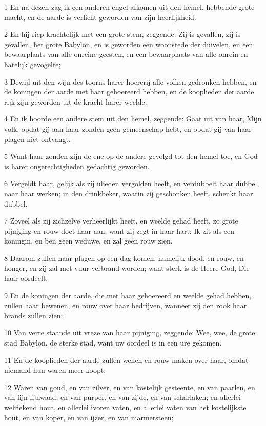 \par 1 En na dezen zag ik een anderen engel afkomen uit den hemel, hebbende grote macht, en de aarde is verlicht geworden van zijn heerlijkheid.
\par 2 En hij riep krachtelijk met een grote stem, zeggende: Zij is gevallen, zij is gevallen, het grote Babylon, en is geworden een woonstede der duivelen, en een bewaarplaats van alle onreine geesten, en een bewaarplaats van alle onrein en hatelijk gevogelte;
\par 3 Dewijl uit den wijn des toorns harer hoererij alle volken gedronken hebben, en de koningen der aarde met haar gehoereerd hebben, en de kooplieden der aarde rijk zijn geworden uit de kracht harer weelde.
\par 4 En ik hoorde een andere stem uit den hemel, zeggende: Gaat uit van haar, Mijn volk, opdat gij aan haar zonden geen gemeenschap hebt, en opdat gij van haar plagen niet ontvangt.
\par 5 Want haar zonden zijn de ene op de andere gevolgd tot den hemel toe, en God is harer ongerechtigheden gedachtig geworden.
\par 6 Vergeldt haar, gelijk als zij ulieden vergolden heeft, en verdubbelt haar dubbel, naar haar werken; in den drinkbeker, waarin zij geschonken heeft, schenkt haar dubbel.
\par 7 Zoveel als zij zichzelve verheerlijkt heeft, en weelde gehad heeft, zo grote pijniging en rouw doet haar aan; want zij zegt in haar hart: Ik zit als een koningin, en ben geen weduwe, en zal geen rouw zien.
\par 8 Daarom zullen haar plagen op een dag komen, namelijk dood, en rouw, en honger, en zij zal met vuur verbrand worden; want sterk is de Heere God, Die haar oordeelt.
\par 9 En de koningen der aarde, die met haar gehoereerd en weelde gehad hebben, zullen haar bewenen, en rouw over haar bedrijven, wanneer zij den rook haar brands zullen zien;
\par 10 Van verre staande uit vreze van haar pijniging, zeggende: Wee, wee, de grote stad Babylon, de sterke stad, want uw oordeel is in een ure gekomen.
\par 11 En de kooplieden der aarde zullen wenen en rouw maken over haar, omdat niemand hun waren meer koopt;
\par 12 Waren van goud, en van zilver, en van kostelijk gesteente, en van paarlen, en van fijn lijnwaad, en van purper, en van zijde, en van scharlaken; en allerlei welriekend hout, en allerlei ivoren vaten, en allerlei vaten van het kostelijkste hout, en van koper, en van ijzer, en van marmersteen;
